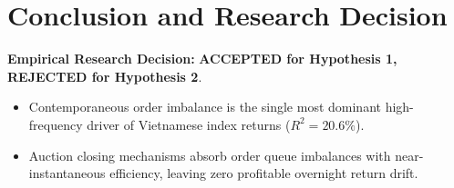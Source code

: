 \documentclass{article}
\begin{document}
\section{Conclusion and Research Decision}
\label{sec:conclusion}

\noindent \textbf{Empirical Research Decision:} \textbf{ACCEPTED for Hypothesis 1, REJECTED for Hypothesis 2}.
\begin{itemize}
    \item Contemporaneous order imbalance is the single most dominant high-frequency driver of Vietnamese index returns ($R^2 = 20.6\%$).
    \item Auction closing mechanisms absorb order queue imbalances with near-instantaneous efficiency, leaving zero profitable overnight return drift.
\end{itemize}



\end{document}
